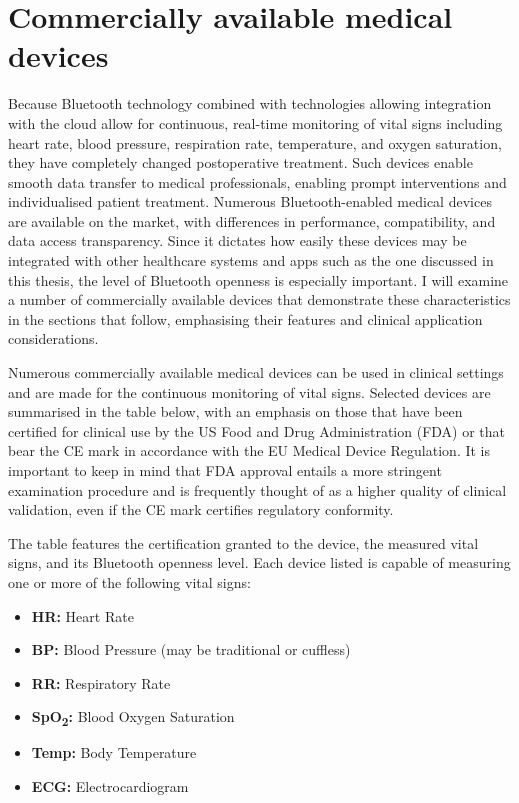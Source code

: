 \section{Commercially available medical devices} %
Because Bluetooth technology combined with technologies allowing integration with the cloud allow for continuous, real-time monitoring of vital signs including heart rate, blood pressure, respiration rate, temperature, and oxygen saturation, they have completely changed postoperative treatment. Such devices enable smooth data transfer to medical professionals, enabling prompt interventions and individualised patient treatment. Numerous Bluetooth-enabled medical devices are available on the market, with differences in performance, compatibility, and data access transparency. Since it dictates how easily these devices may be integrated with other healthcare systems and apps such as the one discussed in this thesis, the level of Bluetooth openness is especially important. I will examine a number of commercially available devices that demonstrate these characteristics in the sections that follow, emphasising their features and clinical application considerations.

Numerous commercially available medical devices can be used in clinical settings and are made for the continuous monitoring of vital signs. Selected devices are summarised in the table below, with an emphasis on those that have been certified for clinical use by the US Food and Drug Administration (FDA) or that bear the CE mark in accordance with the EU Medical Device Regulation. It is important to keep in mind that FDA approval entails a more stringent examination procedure and is frequently thought of as a higher quality of clinical validation, even if the CE mark certifies regulatory conformity.

The table features the certification granted to the device, the measured vital signs, and its Bluetooth openness level. Each device listed is capable of measuring one or more of the following vital signs:

\begin{itemize}
			\item \textbf{HR:} Heart Rate
			\item \textbf{BP:} Blood Pressure (may be traditional or cuffless)
			\item \textbf{RR:} Respiratory Rate
			\item \textbf{SpO\textsubscript{\textbf{2}}:} Blood Oxygen Saturation
			\item \textbf{Temp:} Body Temperature
			\item \textbf{ECG:} Electrocardiogram
\end{itemize}

